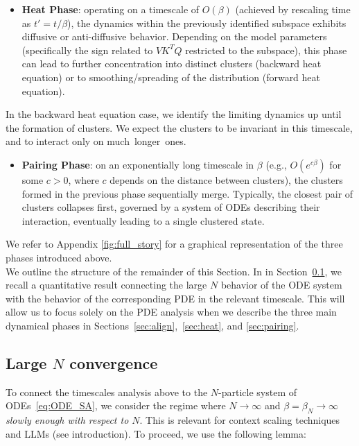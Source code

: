 \documentclass{article}
\numberwithin{theorem}{section}
\begin{document}
\begin{itemize}
    \item \textbf{Heat Phase}: operating on a timescale of $O(\beta)$ (achieved by rescaling time as $t' = t/\beta$), the dynamics within the previously identified subspace exhibits diffusive or anti-diffusive behavior. Depending on the model parameters (specifically the sign related to $VK^TQ$ restricted to the subspace), this phase can lead to further concentration into distinct clusters (backward heat equation) or to smoothing/spreading of the distribution (forward heat equation).
\end{itemize}
In the  backward heat equation case, we  identify the limiting dynamics up until the formation of clusters. We expect the clusters to be invariant in this timescale, and to interact only on much~longer~ones.
 \begin{itemize}
    \item \textbf{Pairing Phase}: on an exponentially long timescale in $\beta$ (e.g., $O(e^{c\beta})$ for some $c>0$, where $c$ depends on the distance between clusters), the clusters formed in the previous phase sequentially merge. Typically, the closest pair of clusters collapses first, governed by a system of ODEs describing their interaction, eventually leading to a single clustered state.
\end{itemize}
We refer to Appendix \ref{fig:full_story} for a graphical representation of the three phases introduced above. \\[-14pt]

We outline the structure of the remainder of this Section. In
in Section~\ref{sec:largen}, we recall a quantitative result connecting the large $N$ behavior of the ODE system with the behavior of the corresponding PDE in the relevant timescale. This will allow us to focus solely on the PDE analysis when we describe the three main dynamical phases in Sections~\ref{sec:align},~\ref{sec:heat}, and \ref{sec:pairing}. 

\subsection{Large $N$ convergence}\label{sec:largen}
To connect the timescales analysis above to the $N$-particle system of ODEs~\eqref{eq:ODE_SA}, we consider the regime where $N \to \infty$ and $\beta = \beta_N \to \infty$ \textit{slowly enough with respect to $N$}. This is relevant for context scaling techniques and LLMs (see introduction). To proceed, we use the following lemma:
\end{document}
